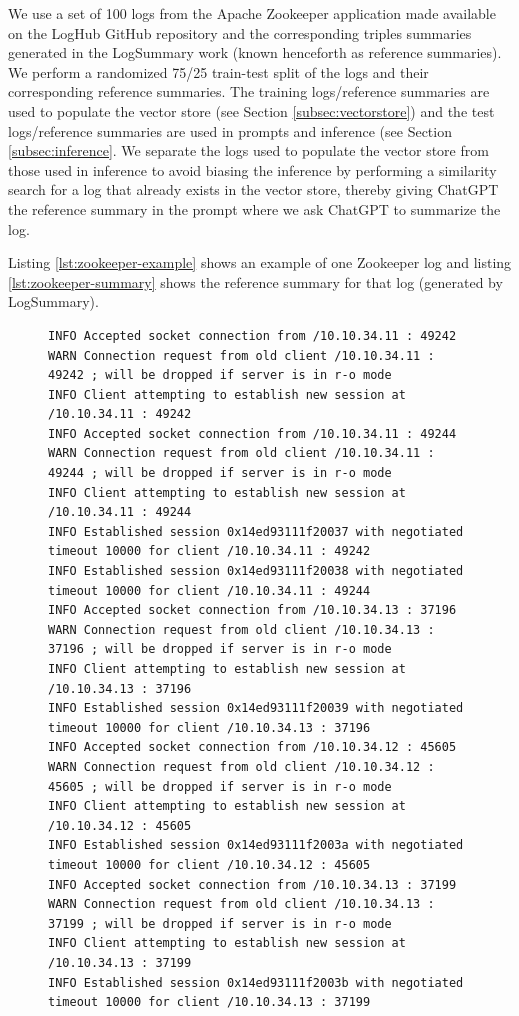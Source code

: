 \documentclass[conference]{IEEEtran}
\begin{document}
We use a set of 100 logs from the Apache Zookeeper \cite{zookeeper} application made available on the LogHub GitHub repository \cite{zhu2023loghub} and the corresponding triples summaries generated in the LogSummary \cite{10017337} work (known henceforth as reference summaries). We perform a randomized 75/25 train-test split of the logs and their corresponding reference summaries. The training logs/reference summaries are used to populate the vector store (see Section \ref{subsec:vectorstore}) and the test logs/reference summaries are used in prompts and inference (see Section \ref{subsec:inference}. We separate the logs used to populate the vector store from those used in inference to avoid biasing the inference by performing a similarity search for a log that already exists in the vector store, thereby giving ChatGPT the reference summary in the prompt where we ask ChatGPT to summarize the log.

Listing \ref{lst:zookeeper-example} shows an example of one Zookeeper log and listing \ref{lst:zookeeper-summary} shows the reference summary for that log (generated by LogSummary).

\begin{figure}[ht]
\begin{lstlisting}[numbers=none, caption=Zookeeper Log Example, label={lst:zookeeper-example}]
INFO Accepted socket connection from /10.10.34.11 : 49242
WARN Connection request from old client /10.10.34.11 : 49242 ; will be dropped if server is in r-o mode
INFO Client attempting to establish new session at /10.10.34.11 : 49242
INFO Accepted socket connection from /10.10.34.11 : 49244
WARN Connection request from old client /10.10.34.11 : 49244 ; will be dropped if server is in r-o mode
INFO Client attempting to establish new session at /10.10.34.11 : 49244
INFO Established session 0x14ed93111f20037 with negotiated timeout 10000 for client /10.10.34.11 : 49242
INFO Established session 0x14ed93111f20038 with negotiated timeout 10000 for client /10.10.34.11 : 49244
INFO Accepted socket connection from /10.10.34.13 : 37196
WARN Connection request from old client /10.10.34.13 : 37196 ; will be dropped if server is in r-o mode
INFO Client attempting to establish new session at /10.10.34.13 : 37196
INFO Established session 0x14ed93111f20039 with negotiated timeout 10000 for client /10.10.34.13 : 37196
INFO Accepted socket connection from /10.10.34.12 : 45605
WARN Connection request from old client /10.10.34.12 : 45605 ; will be dropped if server is in r-o mode
INFO Client attempting to establish new session at /10.10.34.12 : 45605
INFO Established session 0x14ed93111f2003a with negotiated timeout 10000 for client /10.10.34.12 : 45605
INFO Accepted socket connection from /10.10.34.13 : 37199
WARN Connection request from old client /10.10.34.13 : 37199 ; will be dropped if server is in r-o mode
INFO Client attempting to establish new session at /10.10.34.13 : 37199
INFO Established session 0x14ed93111f2003b with negotiated timeout 10000 for client /10.10.34.13 : 37199
\end{lstlisting}
\end{figure}
\end{document}
